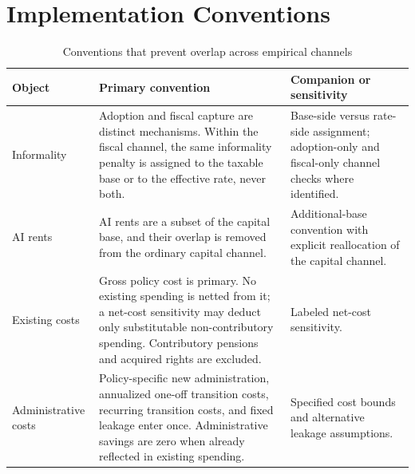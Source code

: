 \section{Implementation Conventions}\label{app:conventions}

\begin{table}[H]
\centering
\small
\caption{Conventions that prevent overlap across empirical channels}
\label{tab:conventions_clean}
\begin{tabular}{@{}>{\raggedright\arraybackslash}p{}>{\raggedright\arraybackslash}p{}>{\raggedright\arraybackslash}p{}@{}}
\toprule
Object & Primary convention & Companion or sensitivity \\
\midrule
Informality & Adoption and fiscal capture are distinct mechanisms. Within the fiscal channel, the same informality penalty is assigned to the taxable base or to the effective rate, never both. & Base-side versus rate-side assignment; adoption-only and fiscal-only channel checks where identified. \\
AI rents & AI rents are a subset of the capital base, and their overlap is removed from the ordinary capital channel. & Additional-base convention with explicit reallocation of the capital channel. \\
Existing costs & Gross policy cost is primary. No existing spending is netted from it; a net-cost sensitivity may deduct only substitutable non-contributory spending. Contributory pensions and acquired rights are excluded. & Labeled net-cost sensitivity. \\
Administrative costs & Policy-specific new administration, annualized one-off transition costs, recurring transition costs, and fixed leakage enter once. Administrative savings are zero when already reflected in existing spending. & Specified cost bounds and alternative leakage assumptions. \\
\bottomrule
\end{tabular}
\end{table}

